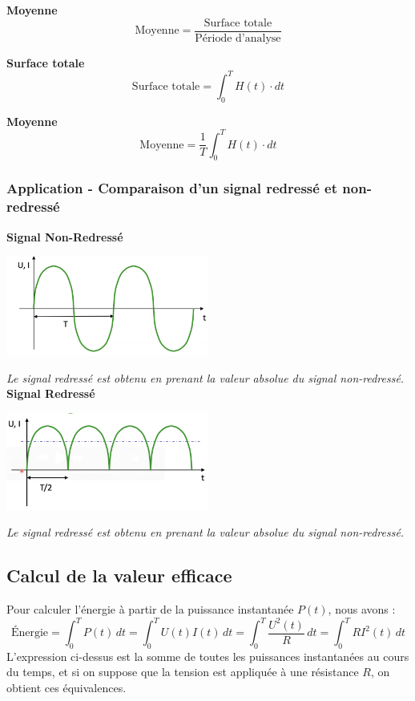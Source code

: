 \textbf{Moyenne} 
\[
\text{Moyenne} = \frac{\text{Surface totale}}{\text{Période d'analyse}}
\]

\textbf{Surface totale} 
\[
\text{Surface totale} = \int_0^T H(t) \cdot dt
\]

\textbf{Moyenne} 
\[
\text{Moyenne} = \frac{1}{T} \int_0^T H(t) \cdot dt
\]
\subsubsection{Application - Comparaison d'un signal redressé et non-redressé}
\textbf{Signal Non-Redressé}
\begin{center}
    \includegraphics[width=0.5\textwidth]{chapters/chapter1/images/nonredresse.png}
\end{center}
\textit{Le signal redressé est obtenu en prenant la valeur absolue du signal non-redressé.} \\
\textbf{Signal Redressé}
\begin{center}
    \includegraphics[width=0.5\textwidth]{chapters/chapter1/images/redresse.png}
\end{center}
\textit{Le signal redressé est obtenu en prenant la valeur absolue du signal non-redressé.} \\

\subsection{Calcul de la valeur efficace}

Pour calculer l'énergie à partir de la puissance instantanée $P(t)$, nous avons :
\[
\text{Énergie} = \int_0^T P(t) \, dt = \int_0^T U(t) I(t) \, dt = \int_0^T \frac{U^2(t)}{R} \, dt = \int_0^T R I^2(t) \, dt
\]
L'expression ci-dessus est la somme de toutes les puissances instantanées au cours du temps, et si on suppose que la tension est appliquée à une résistance $R$, on obtient ces équivalences. 

